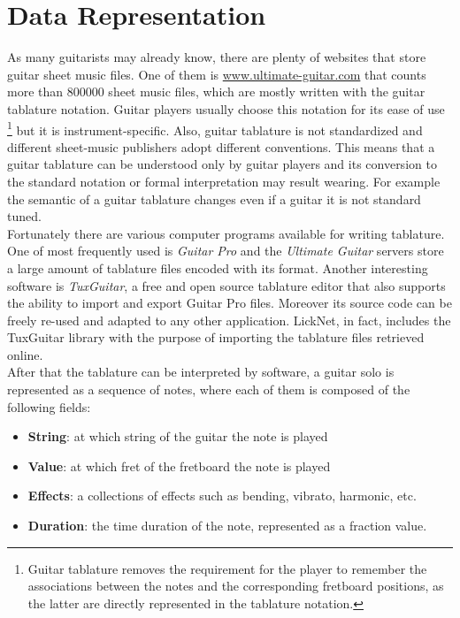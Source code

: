 \documentclass{llncs}
\begin{document}
\section{Data Representation}
As many guitarists may already know, there are plenty of websites that
store guitar sheet music files. One of them is \url{www.ultimate-guitar.com}
that counts more than 800000 sheet music files, which are mostly written
with the guitar tablature notation. Guitar players usually choose this
notation for its ease of use \footnote{Guitar tablature removes the
requirement for the player to remember the associations between the
notes and the corresponding fretboard positions, as the latter are directly
represented in the tablature notation.}
but it is instrument-specific. Also, guitar tablature is not standardized and different 
sheet-music publishers adopt different conventions. This means that a
guitar tablature can be understood only by guitar players and its
conversion to the standard notation or formal interpretation may result
wearing. For example the semantic of a guitar tablature changes even if
a guitar it is not standard tuned.\\
Fortunately there are various computer programs available for writing
tablature. One of most frequently used is \emph{Guitar Pro} and the
\emph{Ultimate
Guitar} servers store a large amount of tablature files encoded with its format.
Another interesting software is \emph{TuxGuitar}, a free and open source
tablature editor that also supports the ability to import and export
Guitar Pro files\cite{tuxguitar}. Moreover its source code can be freely
re-used and adapted to any other application. LickNet, in fact, includes
the TuxGuitar library with the purpose of importing the tablature files retrieved
online.\\
After that the tablature can be interpreted by software, a guitar solo
is represented as a sequence of notes, where each of them is composed
 of the following fields:
\begin{itemize}
	\item \textbf{String}: at which string of the guitar the note is played
	\item \textbf{Value}: at which fret of the fretboard the note is played
	\item \textbf{Effects}: a collections of effects such as bending, vibrato,
		harmonic, etc.
	\item \textbf{Duration}: the time duration of the note, represented
as a fraction value.
\end{itemize}
\end{document}
